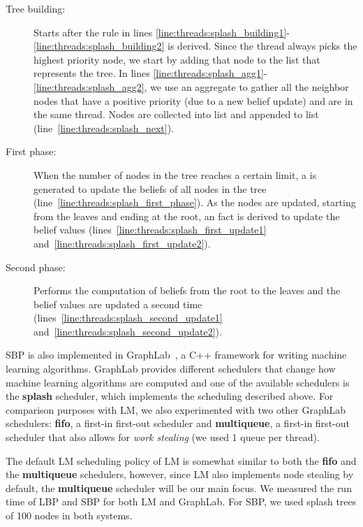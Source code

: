 \begin{description}

   \item[Tree building:] Starts after the rule in lines
      \ref{line:threads:splash_building1}-\ref{line:threads:splash_building2} is
      derived. Since the thread always picks the highest priority node, we start
      by adding that node to the list that represents the tree. In lines
      \ref{line:threads:splash_agg1}-\ref{line:threads:splash_agg2}, we use an
      aggregate to gather all the neighbor nodes that have a positive priority
      (due to a new belief update) and are in the same thread. Nodes are
      collected into list  and appended to list 
      (line~\ref{line:threads:splash_next}).

   \item[First phase:] When the number of nodes in the tree reaches a certain
      limit, a  is generated to update the beliefs of all
      nodes in the tree (line~\ref{line:threads:splash_first_phase}). As the
      nodes are updated, starting from the leaves and ending at the root, an
       fact is derived to update the belief values
      (lines~\ref{line:threads:splash_first_update1}
      and~\ref{line:threads:splash_first_update2}).

   \item[Second phase:] Performs the computation of beliefs from the root to the
      leaves and the belief values are updated a second time
      (lines~\ref{line:threads:splash_second_update1}
      and~\ref{line:threads:splash_second_update2}).

\end{description}

SBP is also implemented in GraphLab~\cite{GraphLab2010}, a C++ framework for
writing machine learning algorithms. GraphLab provides different schedulers that
change how machine learning algorithms are computed and one of the available
schedulers is the \textbf{splash} scheduler, which implements the scheduling
described above. For comparison purposes with LM, we also experimented with two
other GraphLab schedulers: \textbf{fifo}, a first-in first-out scheduler and
\textbf{multiqueue}, a first-in first-out scheduler that also allows for
\textit{work stealing} (we used 1 queue per thread).

The default LM scheduling policy of LM is somewhat similar to both the
\textbf{fifo} and the \textbf{multiqueue} schedulers, however, since LM also
implements node stealing by default, the \textbf{multiqueue} scheduler will be
our main focus. We measured the run time of LBP and SBP for both LM and
GraphLab. For SBP, we used splash trees of 100 nodes in both systems.

